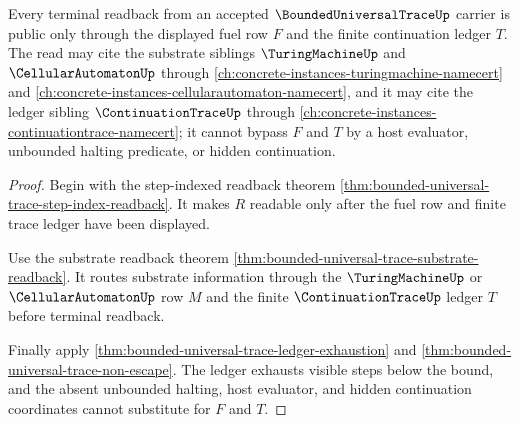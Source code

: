 \begin{theorem}
\label{thm:bounded-universal-trace-terminal-readback-obligation}
Every terminal readback from an accepted $\BoundedUniversalTraceUp$ carrier is public only through the displayed fuel row $F$ and the finite continuation ledger $T$. The read may cite the substrate siblings $\TuringMachineUp$ and $\CellularAutomatonUp$ through \autoref{ch:concrete-instances-turingmachine-namecert} and \autoref{ch:concrete-instances-cellularautomaton-namecert}, and it may cite the ledger sibling $\ContinuationTraceUp$ through \autoref{ch:concrete-instances-continuationtrace-namecert}; it cannot bypass $F$ and $T$ by a host evaluator, unbounded halting predicate, or hidden continuation.
\end{theorem}
\begin{proof}
Begin with the step-indexed readback theorem \autoref{thm:bounded-universal-trace-step-index-readback}. It makes $R$ readable only after the fuel row and finite trace ledger have been displayed.

Use the substrate readback theorem \autoref{thm:bounded-universal-trace-substrate-readback}. It routes substrate information through the $\TuringMachineUp$ or $\CellularAutomatonUp$ row $M$ and the finite $\ContinuationTraceUp$ ledger $T$ before terminal readback.

Finally apply \autoref{thm:bounded-universal-trace-ledger-exhaustion} and \autoref{thm:bounded-universal-trace-non-escape}. The ledger exhausts visible steps below the bound, and the absent unbounded halting, host evaluator, and hidden continuation coordinates cannot substitute for $F$ and $T$.
\end{proof}

